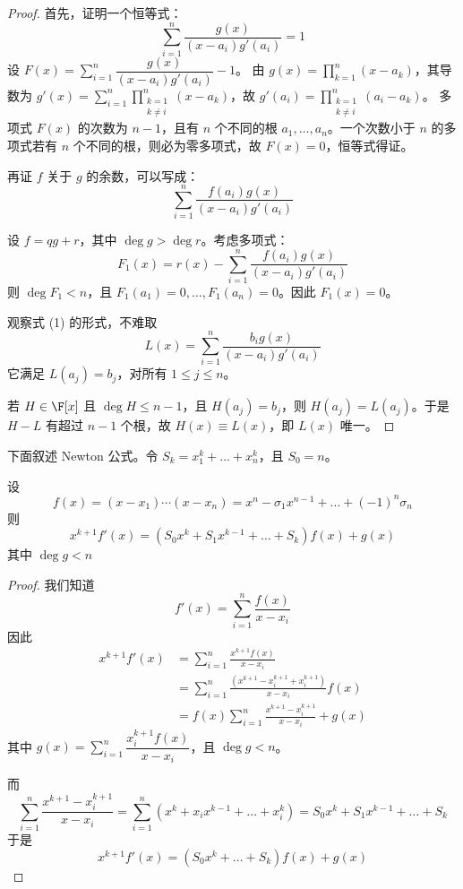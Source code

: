\begin{proof}
	首先，证明一个恒等式：
	\[
	\sum_{i=1}^n \frac{g(x)}{(x-a_i)g'(a_i)} = 1
	\]
	设 \( F(x) = \sum\limits_{i=1}^n \dfrac{g(x)}{(x-a_i)g'(a_i)} - 1 \)。
	由 \( g(x) = \prod\limits_{k=1}^n (x-a_k) \)，其导数为 \( g'(x) = \sum\limits_{i=1}^n \prod\limits_{\substack{k=1 \\ k\neq i}}^n (x-a_k) \)，故 \( g'(a_i) = \prod\limits_{\substack{k=1 \\ k\neq i}}^n (a_i-a_k) \)。
	多项式 \( F(x) \) 的次数为 \( n-1 \)，且有 \( n \) 个不同的根 \( a_1,\dots,a_n \)。一个次数小于 \( n \) 的多项式若有 \( n \) 个不同的根，则必为零多项式，故 \( F(x) = 0 \)，恒等式得证。
	
	再证 \( f \) 关于 \( g \) 的余数，可以写成：
	\[
	\sum_{i=1}^n \frac{f(a_i)g(x)}{(x-a_i)g'(a_i)} \tag{1}
	\]
	
	设 \( f = qg + r \)，其中 \( \deg g > \deg r \)。考虑多项式：
	\[
	F_1(x) = r(x) - \sum_{i=1}^n \frac{f(a_i)g(x)}{(x-a_i)g'(a_i)}
	\]
	则 \( \deg F_1 < n \)，且 \( F_1(a_1)=0, \dots, F_1(a_n)=0 \)。因此 \( F_1(x)=0 \)。
	
	观察式 (1) 的形式，不难取
	\[
	L(x) = \sum_{i=1}^n \frac{b_i g(x)}{(x-a_i)g'(a_i)}
	\]
	它满足 \( L(a_j) = b_j \)，对所有 \( 1 \le j \le n \)。
	
	若 \( H \in \F[x] \) 且 \( \deg H \le n-1 \)，且 \( H(a_j) = b_j \)，则 \( H(a_j) = L(a_j) \)。于是 \( H-L \) 有超过 \( n-1 \) 个根，故 \( H(x) \equiv L(x) \)，即 \( L(x) \) 唯一。
	
\end{proof}
 下面叙述 Newton 公式。令 \( S_k = x_1^k + \dots + x_n^k \)，且 \( S_0 = n \)。
 \begin{lemma}
 	设
 	\[
 	f(x) = (x-x_1)\cdots(x-x_n) = x^n - \sigma_1 x^{n-1} + \dots + (-1)^n \sigma_n
 	\]
 	则
 	\[
 	x^{k+1} f'(x) = (S_0 x^k + S_1 x^{k-1} + \dots + S_k) f(x) + g(x)
 	\]
 	其中 \( \deg g < n \)
 \end{lemma}
\begin{proof}
	 我们知道
	\[
	f'(x) = \sum_{i=1}^n \frac{f(x)}{x-x_i}
	\]
	因此
	\[
	\begin{aligned}
		x^{k+1} f'(x) &= \sum_{i=1}^n \frac{x^{k+1} f(x)}{x-x_i} \\
		&= \sum_{i=1}^n \frac{(x^{k+1} - x_i^{k+1} + x_i^{k+1})}{x-x_i} f(x) \\
		&= f(x) \sum_{i=1}^n \frac{x^{k+1} - x_i^{k+1}}{x-x_i} + g(x)
	\end{aligned}
	\]
	其中 \( g(x) = \sum\limits_{i=1}^n \dfrac{x_i^{k+1} f(x)}{x-x_i} \)，且 \( \deg g < n \)。
	
	而
	\[
	\sum_{i=1}^n \frac{x^{k+1} - x_i^{k+1}}{x-x_i} = \sum_{i=1}^n (x^k + x_i x^{k-1} + \dots + x_i^k) = S_0 x^k + S_1 x^{k-1} + \dots + S_k	\]
	于是
	\[
	x^{k+1} f'(x) = (S_0 x^k + \dots + S_k) f(x) + g(x)
	\]
	
	
\end{proof}


